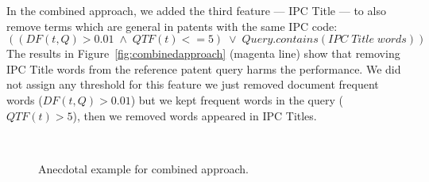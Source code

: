 In the combined approach, we added the third feature --- IPC Title --- to also remove terms which are general in patents with the same IPC code: 
\begin{displaymath} \left(  \left(DF(t, Q)>0.01\; \wedge \; QTF(t)<=5\right)\; \vee\; Query.contains(IPC \; Title \; words) \right)\end{displaymath}
The results in Figure~\ref{fig:combinedapproach} (magenta line) show that removing IPC Title words from the reference patent query harms the performance. We did not assign any threshold for this feature we just removed document frequent words ($DF(t, Q)>0.01$) but we kept frequent words in the query ($QTF(t)>5$), then we removed words appeared in IPC Titles.   
\begin{figure}[t!]
\begin{centering}
 \hspace*{0.1cm}\\[1ex]%

\par\end{centering}

\protect\caption{Anecdotal example for combined approach.}
\label{fig:scatter_combined}
\end{figure}

